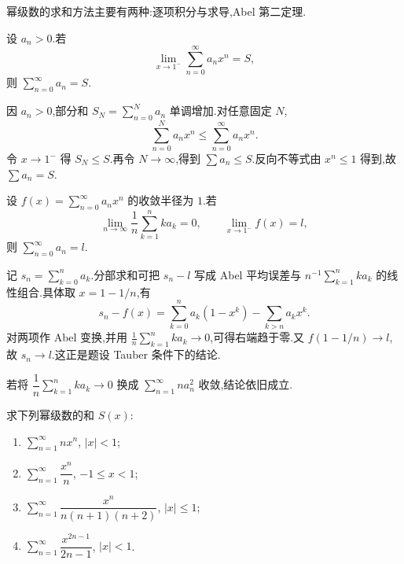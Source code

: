 幂级数的求和方法主要有两种:逐项积分与求导,Abel 第二定理.

\begin{example}
    设 $a_n>0$.若
    \[
        \displaystyle\lim\limits_{x\to1^-}\sum\limits_{n=0}^{\infty}a_nx^n=S,
    \]
    则 $\displaystyle\sum\limits_{n=0}^{\infty}a_n=S$.
\end{example}
\exampleblank

\begin{solution}
    因 $a_n>0$,部分和 $S_N=\displaystyle\sum_{n=0}^Na_n$ 单调增加.对任意固定 $N$,
    \[
        \displaystyle\sum\limits_{n=0}^Na_nx^n\leq\sum\limits_{n=0}^{\infty}a_nx^n.
    \]
    令 $x\to1^-$ 得 $S_N\leq S$.再令 $N\to\infty$,得到
    $\displaystyle\sum a_n\leq S$.反向不等式由 $x^n\leq1$ 得到,故 $\displaystyle\sum a_n=S$.
\end{solution}

\begin{example}
    设 $f(x)=\displaystyle\sum\limits_{n=0}^{\infty}a_nx^n$ 的收敛半径为 $1$.若
    \[
        \displaystyle\lim\limits_{n\to\infty}\dfrac{1}{n}\sum\limits_{k=1}^{n}ka_k=0,
        \qquad
        \lim\limits_{x\to1^-}f(x)=l,
    \]
    则 $\displaystyle\sum\limits_{n=0}^{\infty}a_n=l$.
\end{example}
\exampleblank

\begin{solution}
    记 $s_n=\displaystyle\sum_{k=0}^na_k$.分部求和可把 $s_n-l$ 写成 Abel 平均误差与
    $n^{-1}\displaystyle\sum_{k=1}^nka_k$ 的线性组合.具体取 $x=1-1/n$,有
    \[
        s_n-f(x)=\sum\limits_{k=0}^na_k(1-x^k)-\sum\limits_{k>n}a_kx^k.
    \]
    对两项作 Abel 变换,并用
    $\frac{1}{n}\displaystyle\sum_{k=1}^nka_k\to0$,可得右端趋于零.又 $f(1-1/n)\to l$,故 $s_n\to l$.这正是题设 Tauber 条件下的结论.
\end{solution}

\begin{remark}
    若将 $\displaystyle\dfrac{1}{n}\sum\limits_{k=1}^{n}ka_k\to0$ 换成 $\displaystyle\sum\limits_{n=1}^{\infty}na_n^2$ 收敛,结论依旧成立.
\end{remark}

\begin{example}
    求下列幂级数的和 $S(x)$:
    \begin{enumerate}
        \item $\displaystyle\sum\limits_{n=1}^{\infty}nx^n$, $|x|<1$;
        \item $\displaystyle\sum\limits_{n=1}^{\infty}\dfrac{x^n}{n}$, $-1\leq x<1$;
        \item $\displaystyle\sum\limits_{n=1}^{\infty}\dfrac{x^n}{n(n+1)(n+2)}$, $|x|\leq1$;
        \item $\displaystyle\sum\limits_{n=1}^{\infty}\dfrac{x^{2n-1}}{2n-1}$, $|x|<1$.
    \end{enumerate}
\end{example}
\exampleblank

